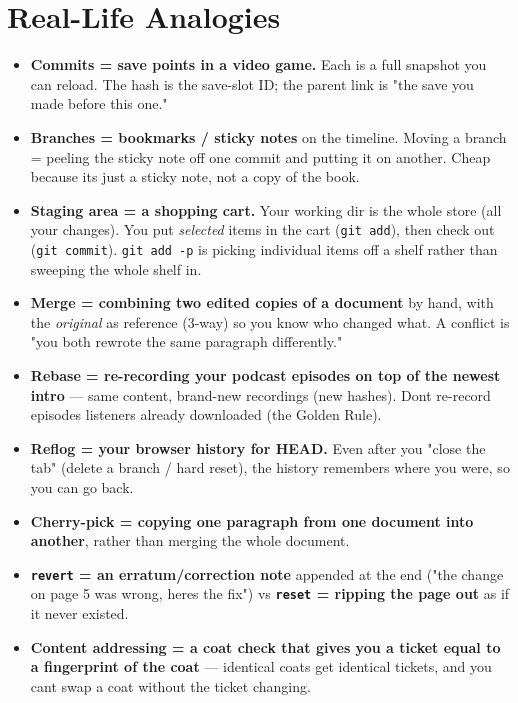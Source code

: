 \documentclass[11pt]{article}
\providecommand{\tightlist}{\setlength{\itemsep}{1pt}\setlength{\parskip}{0pt}}
\begin{document}
\section{Real-Life Analogies}\label{real-life-analogies}

\begin{itemize}
\tightlist
\item
  \textbf{Commits = save points in a video game.} Each is a full snapshot you can reload. The hash is the save-slot ID; the parent link is "the save you made before this one."
\item
  \textbf{Branches = bookmarks / sticky notes} on the timeline. Moving a branch = peeling the sticky note off one commit and putting it on another. Cheap because it\textquotesingle s just a sticky note, not a copy of the book.
\item
  \textbf{Staging area = a shopping cart.} Your working dir is the whole store (all your changes). You put \emph{selected} items in the cart (\texttt{git\ add}), then check out (\texttt{git\ commit}). \texttt{git\ add\ -p} is picking individual items off a shelf rather than sweeping the whole shelf in.
\item
  \textbf{Merge = combining two edited copies of a document} by hand, with the \emph{original} as reference (3-way) so you know who changed what. A conflict is "you both rewrote the same paragraph differently."
\item
  \textbf{Rebase = re-recording your podcast episodes on top of the newest intro} --- same content, brand-new recordings (new hashes). Don\textquotesingle t re-record episodes listeners already downloaded (the Golden Rule).
\item
  \textbf{Reflog = your browser history for HEAD.} Even after you "close the tab" (delete a branch / hard reset), the history remembers where you were, so you can go back.
\item
  \textbf{Cherry-pick = copying one paragraph from one document into another}, rather than merging the whole document.
\item
  \textbf{\texttt{revert} = an erratum/correction note} appended at the end ("the change on page 5 was wrong, here\textquotesingle s the fix") vs \textbf{\texttt{reset} = ripping the page out} as if it never existed.
\item
  \textbf{Content addressing = a coat check that gives you a ticket equal to a fingerprint of the coat} --- identical coats get identical tickets, and you can\textquotesingle t swap a coat without the ticket changing.
\end{itemize}
\end{document}
